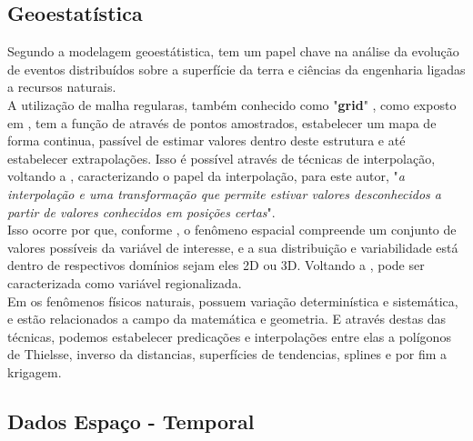  \subsection*{Geoestatística} 

 \hspace*{1.25 cm} Segundo \cite[p.1]{delgado}  a modelagem geoestátistica, tem um papel chave na análise da evolução de eventos distribuídos sobre a superfície da terra e ciências da engenharia ligadas a recursos naturais. \\
   \hspace*{1.25 cm} A  utilização de malha regularas, também conhecido como "\textbf{grid}" , como exposto em \cite[p.83]{Andriotti}, tem a função de através de pontos amostrados, estabelecer um mapa de forma continua, passível de estimar valores dentro deste estrutura e até estabelecer extrapolações. Isso é possível através de técnicas de interpolação, voltando a \cite[p.304]{Ariza},  caracterizando o papel da interpolação, para este autor, "\textit{a interpolação e uma transformação que permite estivar valores desconhecidos a partir de valores conhecidos em posições certas}". \\
    \hspace*{1.25 cm} Isso ocorre por que, conforme \cite[p.21]{Yamamoto}, o fenômeno espacial compreende um conjunto de valores possíveis da variável de interesse, e a sua distribuição e variabilidade está dentro de respectivos domínios sejam eles 2D ou 3D.  Voltando a  \cite[p.95]{Andriotti}, pode ser caracterizada como variável regionalizada.\\
  \hspace*{1.25 cm}  Em  \cite[p.37]{Webster} os fenômenos físicos naturais, possuem variação determinística e sistemática, e estão relacionados a campo da matemática e geometria. E através destas das técnicas, podemos estabelecer predicações e interpolações entre elas a polígonos de Thielsse, inverso da distancias, superfícies de tendencias, splines e por fim a krigagem.   
  \subsection*{Dados Espaço - Temporal} 
  
